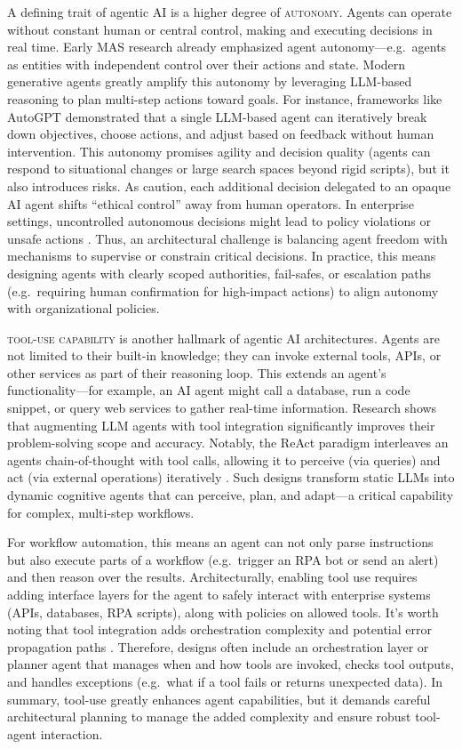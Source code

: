 A defining trait of agentic AI is a higher degree of \textsc{autonomy}. Agents can operate without constant human or central control, making and executing decisions in real time. Early MAS research already emphasized agent autonomy—e.g.~agents as entities with independent control over their actions and state. Modern generative agents greatly amplify this autonomy by leveraging LLM-based reasoning to plan multi-step actions toward goals. For instance, frameworks like AutoGPT \parencite{yangAutoGPT2023} demonstrated that a single LLM-based agent can iteratively break down objectives, choose actions, and adjust based on feedback without human intervention. This autonomy promises agility and decision quality (agents can respond to situational changes or large search spaces beyond rigid scripts), but it also introduces risks. As \textcite{russellResearch2015} caution, each additional decision delegated to an opaque AI agent shifts “ethical control” away from human operators. In enterprise settings, uncontrolled autonomous decisions might lead to policy violations or unsafe actions \parencite{gauravGovernance2025}. Thus, an architectural challenge is balancing agent freedom with mechanisms to supervise or constrain critical decisions. In practice, this means designing agents with clearly scoped authorities, fail-safes, or escalation paths (e.g.~requiring human confirmation for high-impact actions) to align autonomy with organizational policies.

\textsc{tool-use capability} is another hallmark of agentic AI architectures. Agents are not limited to their built-in knowledge; they can invoke external tools, APIs, or other services as part of their reasoning loop. This extends an agent's functionality—for example, an AI agent might call a database, run a code snippet, or query web services to gather real-time information. Research shows that augmenting LLM agents with tool integration significantly improves their problem-solving scope and accuracy. Notably, the ReAct paradigm interleaves an agents chain-of-thought with tool calls, allowing it to perceive (via queries) and act (via external operations) iteratively \parencite{yaoReAct2023}. Such designs transform static LLMs into dynamic cognitive agents that can perceive, plan, and adapt---a critical capability for complex, multi-step workflows.

For workflow automation, this means an agent can not only parse instructions but also execute parts of a workflow (e.g.~trigger an RPA bot or send an alert) and then reason over the results. Architecturally, enabling tool use requires adding interface layers for the agent to safely interact with enterprise systems (APIs, databases, RPA scripts), along with policies on allowed tools. It's worth noting that tool integration adds orchestration complexity and potential error propagation paths \parencite{sapkotaAI2026}. Therefore, designs often include an orchestration layer or planner agent that manages when and how tools are invoked, checks tool outputs, and handles exceptions (e.g.~what if a tool fails or returns unexpected data). In summary, tool-use greatly enhances agent capabilities, but it demands careful architectural planning to manage the added complexity and ensure robust tool-agent interaction.

